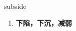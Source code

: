 
\begin{frame}
{\huge subside}
\begin{center}
\begin{enumerate}\Large
  \item \textbf{下陷，下沉，减弱}
\end{enumerate}
\end{center}
\end{frame}
